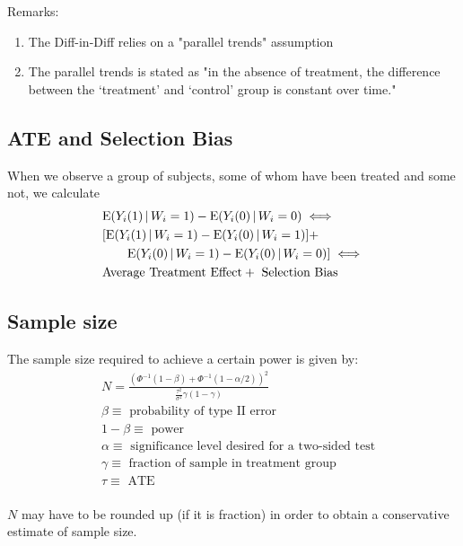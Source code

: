 Remarks:
\begin {enumerate}
\item The Diff-in-Diff relies on a "parallel trends" assumption
\item The parallel trends is stated as "in the absence of treatment, the difference between the ‘treatment’ and ‘control’ group is constant over time."
\end {enumerate}

\subsection {ATE and Selection Bias} 
When we observe a group of subjects, some of whom have been treated and some not, we calculate
\begin {equation} \begin {split}
& \mathrm{E}(Y_i(1) \,\vert\,  W_i = 1) - \mathrm{E}(Y_i(0) \,\vert\,  W_i = 0) \iff \\
& [ \mathrm{E}(Y_i(1) \,\vert\,  W_i = 1) -  \mathrm{E}(Y_i(0) \,\vert\,  W_i = 1) ] +  \\
& \qquad \mathrm{E}(Y_i(0) \,\vert\,  W_i = 1) -  \mathrm{E}(Y_i(0) \,\vert\,  W_i = 0) ] \iff  \\
& \text {Average Treatment Effect} + \text { Selection Bias} \\
\end {split} \end {equation}

\subsection {Sample size}
The sample size required to achieve a certain power is given by:
\begin {equation} \begin {split}
& N = \frac {\left(\Phi^{-1} (1 - \beta) + \Phi^{-1} (1 - \alpha/2) \right)^2} {\frac {\tau^2} {\sigma^2} \gamma (1 - \gamma)} \\
& \beta \equiv \text { probability of type II error} \\
& 1 - \beta \equiv \text { power} \\ 
& \alpha \equiv \text { significance level desired for a two-sided test} \\
& \gamma \equiv \text { fraction of sample in treatment group} \\
& \tau \equiv \text { ATE} \\
\end {split} \end {equation}

$N$ may have to be rounded up (if it is fraction) in order to obtain a conservative estimate of sample size.

